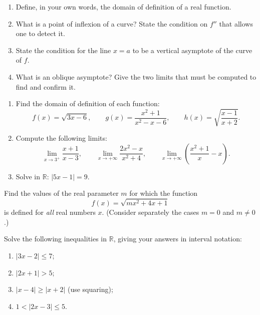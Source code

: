 \documentclass[11pt]{article}
\newcommand{\cle}[1]{{\popxbold\color{popdark}#1}}
\newcounter{popsec}
\newcounter{popsub}
\newcommand{\courssub}[1]{%
  \stepcounter{popsub}%
  \par\vspace{9pt}\noindent{\popxbold\fontsize{11.5}{13}\selectfont\color{popink}{\color{poporange}\thepopsec.\thepopsub}\hspace{6pt}#1}\par\nopagebreak\vspace{4pt}
}
\begin{document}
\begin{exercice}
\begin{enumerate}
\item Define, in your own words, the \cle{domain of definition} of a real function.
\item What is a \cle{point of inflexion} of a curve? State the condition on $f''$ that allows one to detect it.
\item State the condition for the line $x=a$ to be a vertical asymptote of the curve of $f$.
\item What is an \cle{oblique asymptote}? Give the two limits that must be computed to find and confirm it.
\end{enumerate}
\end{exercice}

\begin{exercice}
\begin{enumerate}
\item Find the domain of definition of each function:
\[ f(x)=\sqrt{3x-6}, \qquad g(x)=\frac{x^{2}+1}{x^{2}-x-6}, \qquad h(x)=\sqrt{\frac{x-1}{x+2}}. \]
\item Compute the following limits:
\[ \lim_{x\to 3^{+}}\frac{x+1}{x-3}, \qquad \lim_{x\to+\infty}\frac{2x^{2}-x}{x^{2}+4}, \qquad \lim_{x\to+\infty}\left(\frac{x^{2}+1}{x}-x\right). \]
\item Solve in $\mathbb{R}$: $|5x-1|=9$.
\end{enumerate}
\end{exercice}

\courssub{I practise}

\begin{exercice}
Find the values of the real parameter $m$ for which the function
\[ f(x)=\sqrt{mx^{2}+4x+1} \]
is defined for \emph{all} real numbers $x$. (Consider separately the cases $m=0$ and $m\neq 0$.)
\end{exercice}

\begin{exercice}
Solve the following inequalities in $\mathbb{R}$, giving your answers in interval notation:
\begin{enumerate}
\item $|3x-2|\leq 7$;
\item $|2x+1|>5$;
\item $|x-4|\geq|x+2|$ (use squaring);
\item $1<|2x-3|\leq 5$.
\end{enumerate}
\end{exercice}
\end{document}
